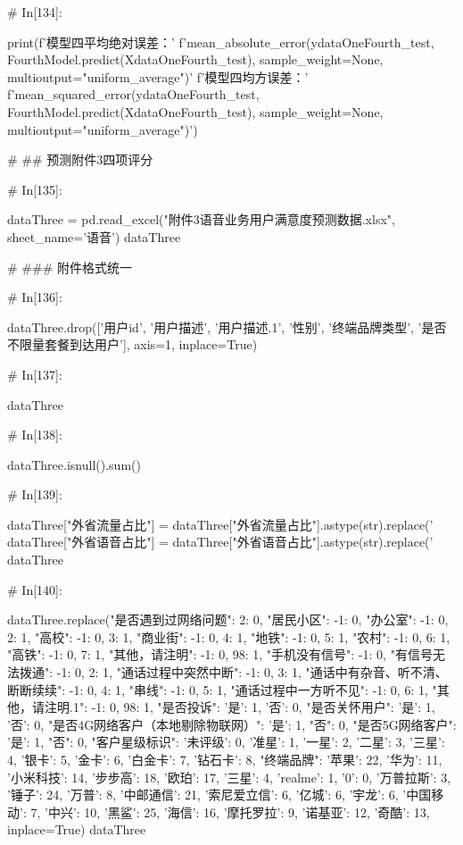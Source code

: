 \documentclass{MathorCupmodeling}
\begin{document}
\begin{python}
	# In[134]:
	
	
	print(f'模型四平均绝对误差：'
		  f'{mean_absolute_error(ydataOneFourth_test, FourthModel.predict(XdataOneFourth_test), sample_weight=None, multioutput="uniform_average")}\n'
		  f'模型四均方误差：'
		  f'{mean_squared_error(ydataOneFourth_test, FourthModel.predict(XdataOneFourth_test), sample_weight=None, multioutput="uniform_average")}')
	
	# ## 预测附件3四项评分
	
	# In[135]:
	
	
	dataThree = pd.read_excel("附件3语音业务用户满意度预测数据.xlsx", sheet_name='语音')
	dataThree
	
	# ### 附件格式统一
	
	# In[136]:
	
	
	dataThree.drop(['用户id', '用户描述', '用户描述.1', '性别', '终端品牌类型', '是否不限量套餐到达用户'], axis=1, inplace=True)
	
	# In[137]:
	
	
	dataThree
	
	# In[138]:
	
	
	dataThree.isnull().sum()
	
	# In[139]:
	
	
	dataThree["外省流量占比"] = dataThree["外省流量占比"].astype(str).replace('%
	dataThree["外省语音占比"] = dataThree["外省语音占比"].astype(str).replace('%
	dataThree
	
	# In[140]:
	
	
	dataThree.replace({"是否遇到过网络问题": {2: 0}, "居民小区": {-1: 0}, "办公室": {-1: 0, 2: 1}, "高校": {-1: 0, 3: 1}, "商业街": {-1: 0, 4: 1}, "地铁": {-1: 0, 5: 1}, "农村": {-1: 0, 6: 1}, "高铁": {-1: 0, 7: 1}, "其他，请注明": {-1: 0, 98: 1}, "手机没有信号": {-1: 0}, "有信号无法拨通": {-1: 0, 2: 1}, "通话过程中突然中断": {-1: 0, 3: 1}, "通话中有杂音、听不清、断断续续": {-1: 0, 4: 1}, "串线": {-1: 0, 5: 1}, "通话过程中一方听不见": {-1: 0, 6: 1}, "其他，请注明.1": {-1: 0, 98: 1}, "是否投诉": {'是': 1, '否': 0}, "是否关怀用户": {'是': 1, '否': 0}, "是否4G网络客户（本地剔除物联网）": {'是': 1, "否": 0}, "是否5G网络客户": {'是': 1, "否": 0}, "客户星级标识": {'未评级': 0, '准星': 1, '一星': 2, '二星': 3, '三星': 4, '银卡': 5, '金卡': 6, '白金卡': 7, '钻石卡': 8}, "终端品牌": {'苹果': 22, '华为': 11, '小米科技': 14, '步步高': 18, '欧珀': 17, '三星': 4, 'realme': 1, '0': 0, '万普拉斯': 3, '锤子': 24, '万普': 8, '中邮通信': 21, '索尼爱立信': 6, '亿城': 6, '宇龙': 6, '中国移动': 7, '中兴': 10, '黑鲨': 25, '海信': 16, '摩托罗拉': 9, '诺基亚': 12, '奇酷': 13}}, inplace=True)
	dataThree
	

\end{python}
\end{document}
